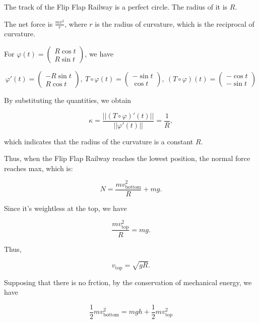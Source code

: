 \documentclass{article}
\begin{document}
    
    
    The track of the Flip Flap Railway is a perfect circle. The radius of it is $R$.

    The net force is $\frac{mv^2}{r}$, where $r$ is the radius of curvature, which is the reciprocal of curvature.
    
    For 
    $
    \varphi(t) = 
    \begin{pmatrix}
    R\cos t \\
    R\sin t
    \end{pmatrix}
    $,
    we have

    $$
    \varphi'(t) = 
    \begin{pmatrix}
    -R\sin t \\
    R\cos t
    \end{pmatrix},\ 
    T\circ\varphi(t) = 
    \begin{pmatrix}
    -\sin t \\
    \cos t
    \end{pmatrix},\ 
    (T\circ\varphi)(t) = 
    \begin{pmatrix}
    -\cos t \\
    -\sin t
    \end{pmatrix}
    $$

    By substituting the quantities, we obtain 

    $$
    \kappa=\frac{||(T\circ\varphi)'(t)||}{||\varphi'(t)||}=\frac{1}{R},
    $$

    which indicates that the radius of the curvature is a constant $R$.

    Thus, when the Flip Flap Railway reaches the lowest position, the normal force reaches max, which is:

    \begin{equation}
    N=\frac{mv_{\mathrm{bottom}}^2}{R}+mg.
    \end{equation}

    Since it's weightless at the top, we have

    \begin{equation}
    \frac{mv_{\mathrm{top}}^2}{R}=mg.
    \end{equation}

    Thus,

    $$
    v_{\mathrm{top}}=\sqrt{gR}.
    $$

    Supposing that there is no frction, by the conservation of mechanical energy, we have 

    \begin{equation}
    \frac{1}{2}mv_{\mathrm{bottom}}^2=mgh+\frac{1}{2}mv_{\mathrm{top}}^2
    \end{equation}
\end{document}
